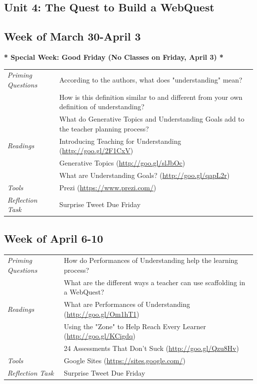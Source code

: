 \documentclass{tufte-handout}
\newcommand{\tabpq}{\faQuestionSign\medspace\textit{Priming Questions}}
\newcommand{\tabread}{\faBook\medspace\textit{Readings}}
\newcommand{\tabtools}{\faWrench\medspace\textit{Tools}}
\newcommand{\tabtweet}{\faLightbulb\medspace\textit{Reflection Task} & Surprise Tweet Due Friday \\}
\newenvironment{tabsched}
	{\small
	\begin{tabular}{p{1.5in}p{5in}}
	\toprule}
	{\bottomrule
	\end{tabular}
	\normalsize}
\begin{document}
\begin{fullwidth}
\section{Unit 4: The Quest to Build a WebQuest}

\subsection{Week of March 30-April 3}

\begin{center}
	\textbf{* Special Week: Good Friday (No Classes on Friday, April 3) *}
\end{center}

\begin{tabsched}
	\tabpq & According to the authors, what does "understanding" mean? \\
	& How is this definition similar to and different from your own definition of understanding? \\
	& What do Generative Topics and Understanding Goals add to the teacher planning process? \\
	\midrule
	\tabread & Introducing Teaching for Understanding (\url{http://goo.gl/2F1CxV}) \\
	& Generative Topics (\url{http://goo.gl/slJbOc}) \\
	& What are Understanding Goals? (\url{http://goo.gl/qapL2r}) \\
	\midrule
	\tabtools & Prezi (\url{https://www.prezi.com/}) \\
	\midrule
	\tabtweet
\end{tabsched}

\subsection{Week of April 6-10}

\begin{tabsched}
	\tabpq & How do Performances of Understanding help the learning process? \\
	& What are the different ways a teacher can use scaffolding in a WebQuest? \\
	\midrule
	\tabread & What are Performances of Understanding (\url{http://goo.gl/Om1hT1}) \\
	& Using the "Zone" to Help Reach Every Learner (\url{http://goo.gl/KCigdq}) \\
	& 24 Assessments That Don't Suck (\url{http://goo.gl/Qzu8Hv}) \\
	\midrule
	\tabtools & Google Sites (\url{https://sites.google.com/}) \\
	\midrule
	\tabtweet
\end{tabsched}


\end{fullwidth}
\end{document}
